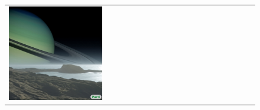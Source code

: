 \begin{figure}[ht!]
\begin{adjustwidth}{-0.8in}{-0.5in}
\begin{tabular}{cccccccccccccccccccc}
\multicolumn{2}{c}{\includegraphics[width=\threebythreecolwidth\textwidth]{figures/cherries/saturn3.jpg}} \\


\end{tabular}
\end{adjustwidth}
\end{figure}
